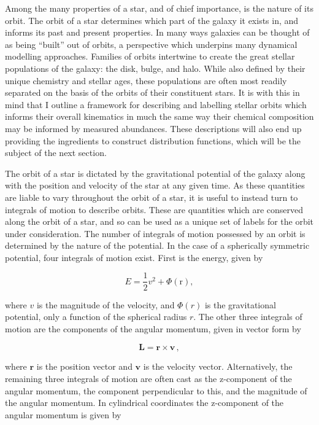 Among the many properties of a star, and of chief importance, is the nature of its orbit. The orbit of a star determines which part of the galaxy it exists in, and informs its past and present properties. In many ways galaxies can be thought of as being ``built'' out of orbits, a perspective which underpins many dynamical modelling approaches. Families of orbits intertwine to create the great stellar populations of the galaxy: the disk, bulge, and halo. While also defined by their unique chemistry and stellar ages, these populations are often most readily separated on the basis of the orbits of their constituent stars. It is with this in mind that I outline a framework for describing and labelling stellar orbits which informs their overall kinematics in much the same way their chemical composition may be informed by measured abundances. These descriptions will also end up providing the ingredients to construct distribution functions, which will be the subject of the next section.

The orbit of a star is dictated by the gravitational potential of the galaxy along with the position and velocity of the star at any given time. As these quantities are liable to vary throughout the orbit of a star, it is useful to instead turn to integrals of motion to describe orbits. These are quantities which are conserved along the orbit of a star, and so can be used as a unique set of labels for the orbit under consideration. The number of integrals of motion possessed by an orbit is determined by the nature of the potential. In the case of a spherically symmetric potential, four integrals of motion exist. First is the energy, given by 

\begin{equation}
    \label{ch1:eq:energy}
    E = \frac{1}{2}v^2 + \Phi(\mathbf{\mathrm{r}}),
\end{equation}

\noindent where $v$ is the magnitude of the velocity, and $\Phi(r)$ is the gravitational potential, only a function of the spherical radius $r$. The other three integrals of motion are the components of the angular momentum, given in vector form by

\begin{equation}
    \label{ch1:eq:angular-momentum}
    \mathbf{L} = \mathbf{r} \times \mathbf{v}\,,
\end{equation}

\noindent where $\mathbf{r}$ is the position vector and $\mathbf{v}$ is the velocity vector. Alternatively, the remaining three integrals of motion are often cast as the z-component of the angular momentum, the component perpendicular to this, and the magnitude of the angular momentum. In cylindrical coordinates the z-component of the angular momentum is given by

